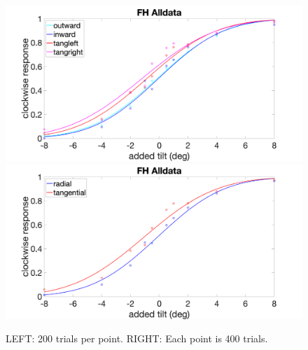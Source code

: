 \documentclass[11pt]{article} %
\begin{document}
\begin{figure}[H]
\centering %
\includegraphics[scale=.16]{Images/FH_PF_Alldata_4conds.png}
\includegraphics[scale=.16]{Images/FH_PF_Alldata_2conds.png}
\caption{LEFT: 200 trials per point. RIGHT: Each point is 400 trials.}
\end{figure}
\end{document}
